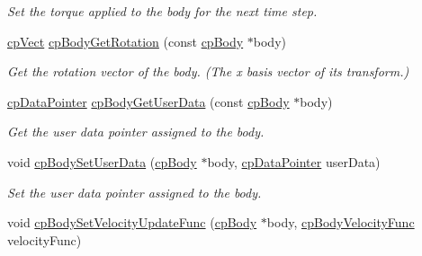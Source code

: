 \begin{DoxyCompactItemize}
\begin{DoxyCompactList}\small\item\em Set the torque applied to the body for the next time step. \end{DoxyCompactList}\item 
\hypertarget{group__cp_body_gac43ff12b33efc516847a01c5a6d9d386}{}\hyperlink{structcp_vect}{cp\+Vect} \hyperlink{group__cp_body_gac43ff12b33efc516847a01c5a6d9d386}{cp\+Body\+Get\+Rotation} (const \hyperlink{structcp_body}{cp\+Body} $\ast$body)\label{group__cp_body_gac43ff12b33efc516847a01c5a6d9d386}

\begin{DoxyCompactList}\small\item\em Get the rotation vector of the body. (The x basis vector of it\textquotesingle{}s transform.) \end{DoxyCompactList}\item 
\hypertarget{group__cp_body_ga1875f311a1af1341e5f857300140d8d3}{}\hyperlink{group__basic_types_ga2ac2c3c31e21893941f9e4f8ee279447}{cp\+Data\+Pointer} \hyperlink{group__cp_body_ga1875f311a1af1341e5f857300140d8d3}{cp\+Body\+Get\+User\+Data} (const \hyperlink{structcp_body}{cp\+Body} $\ast$body)\label{group__cp_body_ga1875f311a1af1341e5f857300140d8d3}

\begin{DoxyCompactList}\small\item\em Get the user data pointer assigned to the body. \end{DoxyCompactList}\item 
\hypertarget{group__cp_body_ga4e800f1df3a042610c8b331cced79c97}{}void \hyperlink{group__cp_body_ga4e800f1df3a042610c8b331cced79c97}{cp\+Body\+Set\+User\+Data} (\hyperlink{structcp_body}{cp\+Body} $\ast$body, \hyperlink{group__basic_types_ga2ac2c3c31e21893941f9e4f8ee279447}{cp\+Data\+Pointer} user\+Data)\label{group__cp_body_ga4e800f1df3a042610c8b331cced79c97}

\begin{DoxyCompactList}\small\item\em Set the user data pointer assigned to the body. \end{DoxyCompactList}\item 
\hypertarget{group__cp_body_ga67efad82793478c1cb1411aa66027573}{}void \hyperlink{group__cp_body_ga67efad82793478c1cb1411aa66027573}{cp\+Body\+Set\+Velocity\+Update\+Func} (\hyperlink{structcp_body}{cp\+Body} $\ast$body, \hyperlink{group__cp_body_gaa7a1f4706fb8e879c356ae99035ead71}{cp\+Body\+Velocity\+Func} velocity\+Func)\label{group__cp_body_ga67efad82793478c1cb1411aa66027573}


\end{DoxyCompactItemize}
